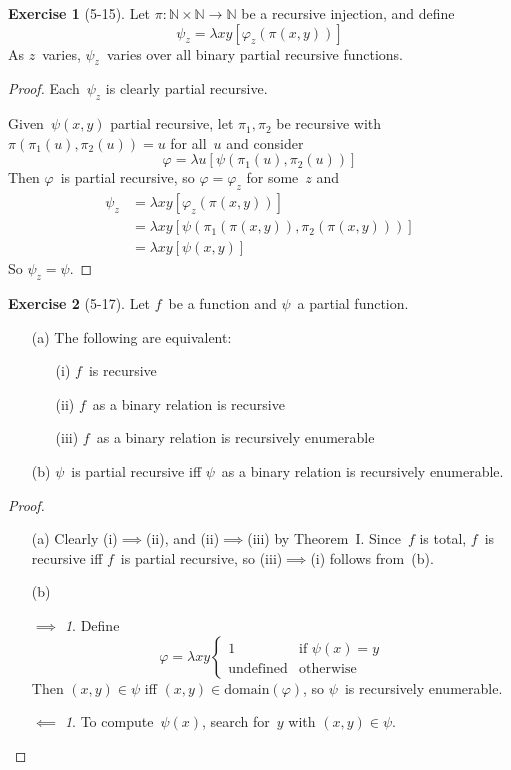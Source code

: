 \documentclass[letterpaper]{article}
\newcommand{\N}{\mathbb{N}}
\newcommand{\dom}{\mathrm{domain}}
\theoremstyle{definition}
\newtheorem*{exer}{Exercise}
\theoremstyle{remark}
\theoremstyle{direction}
\newtheorem*{fwd}{$\implies$}
\newtheorem*{bwd}{$\impliedby$}
\begin{document}
\begin{exer}[5-15]
Let $\pi:\N\times\N\to\N$ be a recursive injection, and define
$$\psi_z=\lambda xy[\varphi_z(\pi(x,y))]$$
As $z$~varies, $\psi_z$~varies over all binary partial recursive functions.
\end{exer}
\begin{proof}
Each~$\psi_z$ is clearly partial recursive.

Given~$\psi(x,y)$ partial recursive, let $\pi_1,\pi_2$ be recursive with $\pi(\pi_1(u),\pi_2(u))=u$ for all~$u$ and consider
$$\varphi=\lambda u[\psi(\pi_1(u),\pi_2(u))]$$
Then $\varphi$~is partial recursive, so $\varphi=\varphi_z$ for some~$z$ and
\begin{align*}
\psi_z&=\lambda xy[\varphi_z(\pi(x,y))]\\
	&=\lambda xy[\psi(\pi_1(\pi(x,y)),\pi_2(\pi(x,y)))]\\
	&=\lambda xy[\psi(x,y)]
\end{align*}
So $\psi_z=\psi$.
\end{proof}

\begin{exer}[5-17]
Let $f$~be a function and $\psi$~a partial function.
\begin{enumerate}[itemsep=0pt]
\item[(a)] The following are equivalent:
\begin{enumerate}[itemsep=0pt]
\item[(i)] $f$~is recursive
\item[(ii)] $f$~as a binary relation is recursive
\item[(iii)] $f$~as a binary relation is recursively enumerable
\end{enumerate}
\item[(b)] $\psi$~is partial recursive iff $\psi$~as a binary relation is recursively enumerable.
\end{enumerate}
\end{exer}
\begin{proof}
\begin{enumerate}[itemsep=0pt]
\item[(a)] Clearly (i)$\implies$(ii), and (ii)$\implies$(iii) by Theorem~I. Since~$f$ is total, $f$~is recursive iff $f$~is partial recursive, so (iii)$\implies$(i) follows from~(b).
\item[(b)]
\begin{fwd}
Define
$$\varphi=\lambda xy\begin{cases}
1&\text{if }\psi(x)=y\\
\text{undefined}&\text{otherwise}
\end{cases}$$
Then $(x,y)\in\psi$ iff $(x,y)\in\dom(\varphi)$, so $\psi$~is recursively enumerable.
\end{fwd}
\begin{bwd}
To compute~$\psi(x)$, search for~$y$ with $(x,y)\in\psi$.\qedhere
\end{bwd}
\end{enumerate}
\end{proof}
\end{document}

